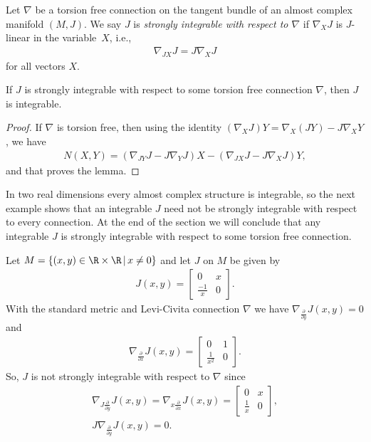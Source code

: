 \begin{defn} \label{defn:strongint}
Let $\nabla$ be a torsion free connection on the tangent bundle of an almost complex manifold $(M,J)$. We say $J$ is \emph{strongly integrable with respect to $\nabla$} if $\nabla_X J$ is $J$-linear in the variable~$X$, i.e.,
\begin{gather*}
\nabla_{JX} J = J \nabla_X J
\end{gather*}
for all vectors $X$.
\end{defn}

\begin{lem} \label{lem;strongimpliesint}
If $J$ is strongly integrable with respect to some torsion free connection $\nabla$, then $J$ is integrable.
\end{lem}

\begin{proof}
If $\nabla$ is torsion free, then using the identity $(\nabla_X J) Y = \nabla_X (J Y) - J \nabla_X Y$, we have
\begin{gather}
N(X,Y) = (\nabla_{JY} J - J \nabla_Y J) X - (\nabla_{JX} J - J \nabla_X J)Y, \label{eq:Nnabla}
\end{gather}
and that proves the lemma.
\end{proof}

In two real dimensions every almost complex structure is integrable, so the next example shows that an integrable $J$ need not be strongly integrable with respect to every connection. At the end of the section we will conclude that any integrable $J$ is strongly integrable with respect to some torsion free connection.

\begin{ex} \label{ex;2dex}Let $M = \{ (x,y) \in \R \times \R\, | \, x \neq 0 \}$ and let
$J$ on $M$ be given by
\begin{gather*}
J(x,y) =
\begin{bmatrix}
0 & x \\
\frac {-1}{ x} & 0
\end{bmatrix}.
\end{gather*}
With the standard metric and Levi-Civita connection $\nabla$ we have $\nabla_{\frac{\partial }{\partial y}} J(x,y) = 0$
and
\begin{gather*}
\nabla_{\frac{\partial }{\partial x}} J(x,y) =
\begin{bmatrix}
0 & 1 \\
\frac{1}{ x^2} & 0
\end{bmatrix}.
\end{gather*}
So, $J$ is not strongly integrable with respect to $\nabla$ since
\begin{gather*}
 \nabla_{ J \frac{\partial }{\partial y}} J(x,y)= \nabla_{x \frac{\partial }{\partial x}} J(x,y) =
\begin{bmatrix}
0 & x \\
\frac{1}{ x} & 0
\end{bmatrix}, \\
J \nabla_{\frac{\partial }{\partial y}} J(x,y)= 0 .
\end{gather*}
\end{ex}

